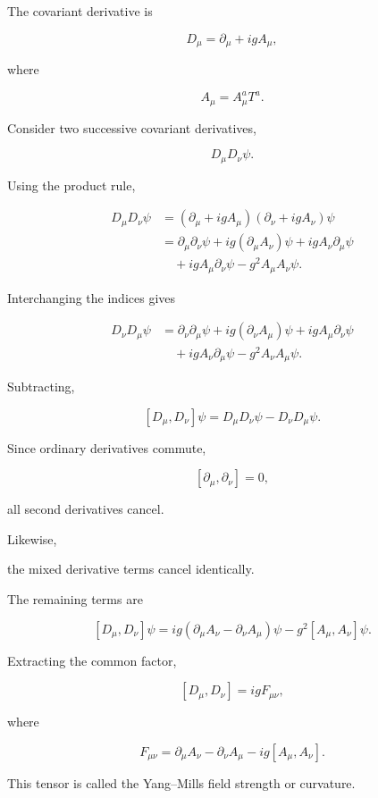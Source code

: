 The covariant derivative is

\[
D_\mu
=
\partial_\mu
+
igA_\mu,
\]

where

\[
A_\mu
=
A_\mu^aT^a.
\]

Consider two successive covariant derivatives,

\[
D_\mu D_\nu\psi.
\]

Using the product rule,

\[
\begin{aligned}
D_\mu D_\nu\psi
&=
(\partial_\mu+igA_\mu)
(\partial_\nu+igA_\nu)\psi
\\
&=
\partial_\mu\partial_\nu\psi
+
ig(\partial_\mu A_\nu)\psi
+
igA_\nu\partial_\mu\psi
\\
&
\quad
+
igA_\mu\partial_\nu\psi
-
g^2A_\mu A_\nu\psi.
\end{aligned}
\]

Interchanging the indices gives

\[
\begin{aligned}
D_\nu D_\mu\psi
&=
\partial_\nu\partial_\mu\psi
+
ig(\partial_\nu A_\mu)\psi
+
igA_\mu\partial_\nu\psi
\\
&
\quad
+
igA_\nu\partial_\mu\psi
-
g^2A_\nu A_\mu\psi.
\end{aligned}
\]

Subtracting,

\[
[D_\mu,D_\nu]\psi
=
D_\mu D_\nu\psi
-
D_\nu D_\mu\psi.
\]

Since ordinary derivatives commute,

\[
[\partial_\mu,\partial_\nu]=0,
\]

all second derivatives cancel.

Likewise,

the mixed derivative terms cancel identically.

The remaining terms are

\[
[D_\mu,D_\nu]\psi
=
ig
(\partial_\mu A_\nu
-
\partial_\nu A_\mu)\psi
-
g^2
[A_\mu,A_\nu]\psi.
\]

Extracting the common factor,

\[
\boxed{
[D_\mu,D_\nu]
=
igF_{\mu\nu},
}
\]

where

\[
\boxed{
F_{\mu\nu}
=
\partial_\mu A_\nu
-
\partial_\nu A_\mu
-
ig[A_\mu,A_\nu].
}
\]

This tensor is called the Yang--Mills field strength or curvature.


